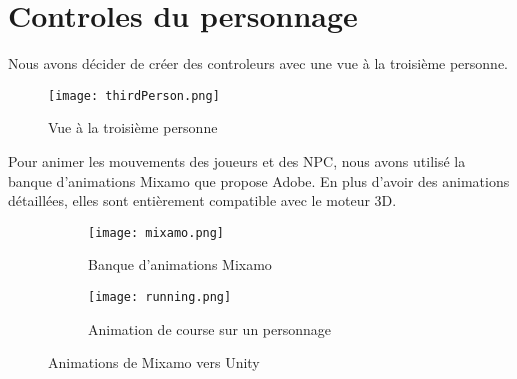 \documentclass[../doc.tex ]{subfiles}
\begin{document}
\section{Controles du personnage}
Nous avons décider de créer des controleurs avec une vue à la troisième personne.
\begin{figure}[h]
    \centering
    \texttt{[image: thirdPerson.png]}
    \caption{Vue à la troisième personne}
\end{figure}
\FloatBarrier
Pour animer les mouvements des joueurs et des NPC, nous avons utilisé la banque d'animations Mixamo que propose Adobe.
En plus d'avoir des animations détaillées, elles sont entièrement compatible avec le moteur 3D.
\begin{figure}[!htbp]
    \centering
    \begin{subfigure}[b]{0.3\textwidth}
        \texttt{[image: mixamo.png]} 
        \caption{Banque d'animations Mixamo}
    \end{subfigure}
    \hfill
    \begin{subfigure}[b]{0.3\textwidth}
        \texttt{[image: running.png]} 
        \caption{Animation de course sur un personnage}
    \end{subfigure}
    \caption{Animations de Mixamo vers Unity}
\end{figure}
\FloatBarrier
\end{document}
